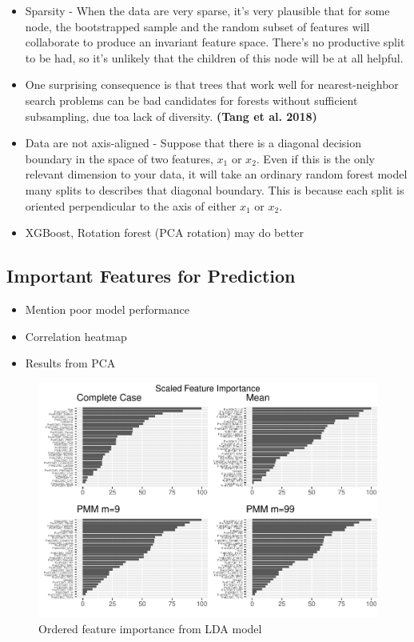 \documentclass[12pt,]{article}
\providecommand{\tightlist}{%
  \setlength{\itemsep}{0pt}\setlength{\parskip}{0pt}}
\begin{document}
\begin{itemize}
\item
  Sparsity - When the data are very sparse, it's very plausible that for
  some node, the bootstrapped sample and the random subset of features
  will collaborate to produce an invariant feature space. There's no
  productive split to be had, so it's unlikely that the children of this
  node will be at all helpful.
\item
  One surprising consequence is that trees that work well for
  nearest-neighbor search problems can be bad candidates for forests
  without sufficient subsampling, due toa lack of diversity.
  \textbf{(Tang et al. 2018)}
\item
  Data are not axis-aligned - Suppose that there is a diagonal decision
  boundary in the space of two features, \(x_1\) or \(x_2\). Even if
  this is the only relevant dimension to your data, it will take an
  ordinary random forest model many splits to describes that diagonal
  boundary. This is because each split is oriented perpendicular to the
  axis of either \(x_1\) or \(x_2\).
\item
  XGBoost, Rotation forest (PCA rotation) may do better
\end{itemize}

\subsection{Important Features for
Prediction}\label{important-features-for-prediction}

\begin{itemize}
\tightlist
\item
  Mention poor model performance
\item
  Correlation heatmap
\item
  Results from PCA
\end{itemize}

\begin{figure}[H]

{\centering \includegraphics[width=1\linewidth]{figure/graphics-unnamed-chunk-9-1} 

}

\caption{\label{fig:feature-importance-lda}Ordered feature importance from LDA model}\label{fig:unnamed-chunk-9}
\end{figure}
\end{document}
